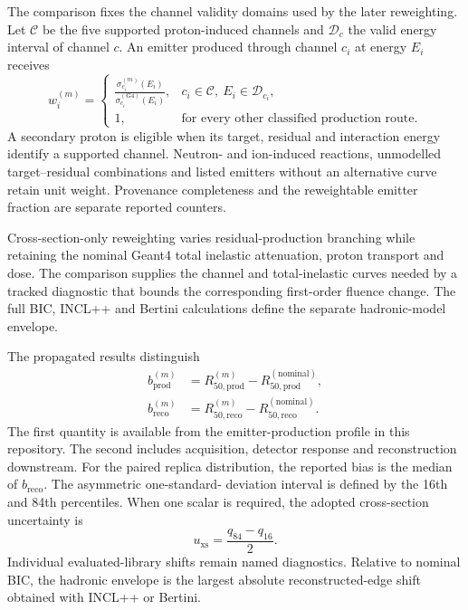 \documentclass[11pt]{article}
\begin{document}
The comparison fixes the channel validity domains used by the later
reweighting.  Let $\mathcal{C}$ be the five supported proton-induced channels
and $\mathcal{D}_c$ the valid energy interval of channel $c$.  An emitter
produced through channel $c_i$ at energy $E_i$ receives
\begin{equation}
  w_i^{(m)} =
  \begin{cases}
    \displaystyle
    \frac{\sigma_{c_i}^{(m)}(E_i)}
         {\sigma_{c_i}^{(\mathrm{G4})}(E_i)},
      & c_i\in\mathcal{C},\ E_i\in\mathcal{D}_{c_i},\\
    1, & \text{for every other classified production route}.
  \end{cases}
\end{equation}
A secondary proton is eligible when its target, residual and interaction
energy identify a supported channel.  Neutron- and ion-induced reactions,
unmodelled target--residual combinations and listed emitters without an
alternative curve retain unit weight.  Provenance completeness and the
reweightable emitter fraction are separate reported counters.

Cross-section-only reweighting varies residual-production branching while
retaining the nominal Geant4 total inelastic attenuation, proton transport and
dose.  The comparison supplies the channel and total-inelastic curves needed by
a tracked diagnostic that bounds the corresponding first-order fluence change.
The full BIC, INCL++ and Bertini calculations define the separate
hadronic-model envelope.

The propagated results distinguish
\begin{align}
  b_{\mathrm{prod}}^{(m)}
    &=R_{50,\mathrm{prod}}^{(m)}-
      R_{50,\mathrm{prod}}^{(\mathrm{nominal})},\\
  b_{\mathrm{reco}}^{(m)}
    &=R_{50,\mathrm{reco}}^{(m)}-
      R_{50,\mathrm{reco}}^{(\mathrm{nominal})}.
\end{align}
The first quantity is available from the emitter-production profile in this
repository.  The second includes acquisition, detector response and
reconstruction downstream.  For the paired replica distribution, the reported
bias is the median of $b_{\mathrm{reco}}$.  The asymmetric one-standard-
deviation interval is defined by the 16th and 84th percentiles.  When one scalar
is required, the adopted cross-section uncertainty is
\begin{equation}
  u_{\mathrm{xs}}=\frac{q_{84}-q_{16}}{2}.
\end{equation}
Individual evaluated-library shifts remain named diagnostics.  Relative to
nominal BIC, the hadronic envelope is the largest absolute reconstructed-edge
shift obtained with INCL++ or Bertini.
\end{document}
